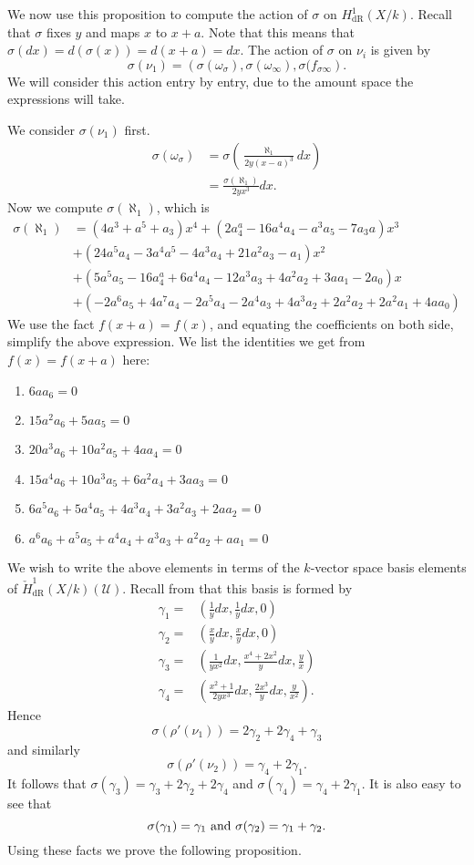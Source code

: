 \documentclass[draft, 11pt]{article} %
\theoremstyle{plain}
\theoremstyle{remark}
\newcommand{\cU}{{\mathcal U}}
\newcommand{\derhamhone}{H_{\text {dR}}^1(X/k)}
\newcommand{\cechderhamhone}{\check{H}_{\text {dR}}^1(X/k)}
\begin{document}
We now use this proposition to compute the action of $\sigma $ on $\derhamhone$.
Recall that $\sigma$ fixes $y$ and maps $x$ to $x+a$. 
Note that this means that $\sigma(dx) = d(\sigma(x)) = d(x+a) = dx$.
The action of $\sigma$ on $\nu_i$ is given by
\begin{equation*}
\sigma(\nu_1) = \left( \sigma( \omega_{\sigma}), \sigma(\omega_{\infty}), \sigma( f_{\sigma \infty}\right).
\end{equation*}
We will consider this action entry by entry, due to the amount space the expressions will take.

We consider $\sigma(\nu_1)$ first.
\begin{align*}
\sigma( \omega_{\sigma}) & = \sigma \left( \frac{\aleph_1}{2y(x-a)^3} dx \right) \\
& = \frac{\sigma(\aleph_1)}{2yx^3}dx.
\end{align*}
Now we compute $\sigma(\aleph_1)$, which is
\begin{align*}
\sigma(\aleph_1) & = (4a^3+a^5+a_3)x^4 + (2a^a_4-16a^4a_4-a^3a_5-7a_3a)x^3 \\
& + (24a^5a_4-3a^4a^5-4a^3a_4+21a^2a_3-a_1)x^2 \\
& + (5a^5a_5-16a^a_4+6a^4a_4-12a^3a_3+4a^2a_2+3aa_1-2a_0)x \\
& + (-2a^6a_5+4a^7a_4-2a^5a_4-2a^4a_3+4a^3a_2+2a^2a_2+2a^2a_1+4aa_0)
\end{align*}
We use the fact $f(x+a) = f(x)$, and equating the coefficients on both side, simplify the above expression.
We list the identities we get from $f(x) = f(x+a)$ here:
\begin{enumerate}
\item $6aa_6=0$
\item $15a^2a_6+5aa_5 = 0$
\item $20a^3a_6+10a^2a_5+4aa_4 = 0$
\item $15a^4a_6 + 10a^3a_5 + 6a^2a_4+3aa_3= 0$
\item $6a^5a_6 + 5a^4a_5+4a^3a_4+3a^2a_3+2aa_2= 0$
\item $a^6a_6+a^5a_5+a^4a_4+a^3a_3+a^2a_2+aa_1 = 0$
\end{enumerate}


We wish to write the above elements in terms of the $k$-vector space basis elements of $\cechderhamhone(\cU)$.
Recall from \cite{derhamactions} that this basis is formed by
\begin{align*}
\gamma_1  = & \left( \frac{1}{y}dx, \frac{1}{y}dx, 0\right) \\
\gamma_2 = & \left(\frac{x}{y}dx, \frac{x}{y}dx, 0\right) \\
\gamma_3 = & \left( \frac{1}{yx^2}dx, \frac{x^4 + 2x^2}{y}dx, \frac{y}{x} \right)\\
\gamma_4 = & \left(\frac{x^2+1}{2yx^3}dx, \frac{2x^3}{y}dx, \frac{y}{x^2} \right).
\end{align*}
Hence
\[
\sigma(\rho'(\nu_1)) = 2 \gamma_2 + 2\gamma_4 + \gamma_3
\]
and similarly
\[
\sigma(\rho'(\nu_2)) = \gamma_4 + 2 \gamma_1.
\]
It follows that $\sigma(\gamma_3) = \gamma_3 + 2\gamma_2 + 2 \gamma_4$ and $\sigma(\gamma_4) = \gamma_4 + 2\gamma_1$.
It is also easy to see that
\[
\sigma(\gamma_1) = \gamma_1 \ {\rm and} \ \sigma(\gamma_2) = \gamma_1 + \gamma_2.
\]
Using these facts we prove the following proposition.
\end{document}
